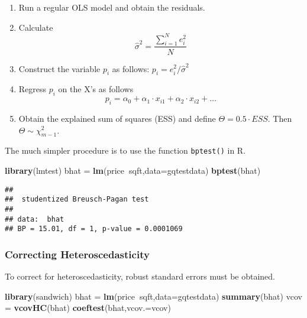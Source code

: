 \documentclass[
]{article}
\newenvironment{Shaded}{\begin{snugshade}}{\end{snugshade}}
\newcommand{\DataTypeTok}[1]{\textcolor[rgb]{0.13,0.29,0.53}{#1}}
\newcommand{\KeywordTok}[1]{\textcolor[rgb]{0.13,0.29,0.53}{\textbf{#1}}}
\newcommand{\NormalTok}[1]{#1}
\newcommand{\OperatorTok}[1]{\textcolor[rgb]{0.81,0.36,0.00}{\textbf{#1}}}
\newcommand{\StringTok}[1]{\textcolor[rgb]{0.31,0.60,0.02}{#1}}
\providecommand{\tightlist}{%
  \setlength{\itemsep}{0pt}\setlength{\parskip}{0pt}}
\begin{document}
\begin{enumerate}
\def\labelenumi{\arabic{enumi}.}
\tightlist
\item
  Run a regular OLS model and obtain the residuals.
\item
  Calculate
  \[\hat{\sigma}^2 = \frac{\sum_{i=1}^N e^2_i}{N}\]
\item
  Construct the variable \(p_i\) as follows: \(p_i = e^2_i / \hat{\sigma}^2\)
\item
  Regress \(p_i\) on the X's as follows
  \[p_i = \alpha_0 + \alpha_1 \cdot x_{i1}+\alpha_2 \cdot x_{i2} + \dots\]
\item
  Obtain the explained sum of squares (ESS) and define \(\Theta = 0.5 \cdot ESS\). Then \(\Theta \sim \chi^2_{m-1}\).
\end{enumerate}

The much simpler procedure is to use the function \texttt{bptest()} in R.

\begin{Shaded}
\begin{Highlighting}[]
\KeywordTok{library}\NormalTok{(lmtest)}
\NormalTok{bhat                =}\StringTok{ }\KeywordTok{lm}\NormalTok{(price}\OperatorTok{~}\NormalTok{sqft,}\DataTypeTok{data=}\NormalTok{gqtestdata)}
\KeywordTok{bptest}\NormalTok{(bhat)}
\end{Highlighting}
\end{Shaded}

\begin{verbatim}
## 
##  studentized Breusch-Pagan test
## 
## data:  bhat
## BP = 15.01, df = 1, p-value = 0.0001069
\end{verbatim}

\hypertarget{correcting-heteroscedasticity}{%
\subsubsection{Correcting Heteroscedasticity}\label{correcting-heteroscedasticity}}

To correct for heteroscedasticity, robust standard errors must be obtained.

\begin{Shaded}
\begin{Highlighting}[]
\KeywordTok{library}\NormalTok{(sandwich)}
\NormalTok{bhat =}\StringTok{ }\KeywordTok{lm}\NormalTok{(price}\OperatorTok{~}\NormalTok{sqft,}\DataTypeTok{data=}\NormalTok{gqtestdata)}
\KeywordTok{summary}\NormalTok{(bhat)}
\NormalTok{vcov =}\StringTok{ }\KeywordTok{vcovHC}\NormalTok{(bhat)}
\KeywordTok{coeftest}\NormalTok{(bhat,}\DataTypeTok{vcov.=}\NormalTok{vcov)}
\end{Highlighting}
\end{Shaded}
\end{document}

